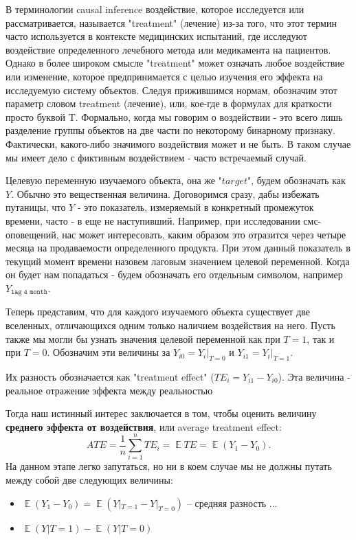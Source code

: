 \documentclass{article}
\DeclareMathOperator{\E}{\mathbb{E}}
\begin{document}
        В терминологии causal inference воздействие, которое исследуется или рассматривается, называется "treatment"{} (лечение) из-за того, что этот термин часто используется в контексте медицинских испытаний, где исследуют воздействие определенного лечебного метода или медикамента на пациентов. Однако в более широком смысле "treatment"{} может означать любое воздействие или изменение, которое предпринимается с целью изучения его эффекта на исследуемую систему объектов. Следуя прижившимся нормам, обозначим этот параметр словом treatment (лечение), или, кое-где в формулах для краткости просто буквой T. Формально, когда мы говорим о воздействии - это всего лишь разделение группы объектов на две части по некоторому бинарному признаку. Фактически, какого-либо значимого воздействия может и не быть. В таком случае мы имеет дело с фиктивным воздействием - часто встречаемый случай.

        Целевую переменную изучаемого объекта, она же "$target$"{}, будем обозначать как $Y$. Обычно это вещественная величина. Договоримся сразу, дабы избежать путаницы, что $Y$ - это показатель, измеряемый в конкретный промежуток времени, часто - в еще не наступивший. Например, при исследовании смс-оповещений, нас может интересовать, каким образом это отразится через четыре месяца на продаваемости определенного продукта. При этом данный показатель в текущий момент времени назовем лаговым значением целевой переменной. Когда он будет нам попадаться - будем обозначать его отдельным символом, например $Y_\texttt{lag 4 month}$.

        Теперь представим, что для каждого изучаемого объекта существует две вселенных, отличающихся одним только наличием воздействия на него. Пусть также мы могли бы узнать значения целевой переменной как при $T=1$, так и при $T=0$. Обозначим эти величины за $Y_{i0} = Y_i|_{T=0}$ и  $Y_{i1}=Y_i|_{T=1}$.

        Их разность обозначается как "treatment effect" ($TE_i=Y_{i1}-Y_{i0}$). Эта величина - реальное отражение эффекта между реальностью

        Тогда наш истинный интерес заключается в том, чтобы оценить величину \textbf{среднего эффекта от воздействия}, или average treatment effect:
        $$
            ATE=
            \frac{1}{n}\displaystyle\sum_{i=1}^nTE_i=
            \E{}TE=
            \E{}(Y_1-Y_0).
        $$
        На данном этапе легко запутаться, но ни в коем случае мы не должны путать между собой две следующих величины:
        \begin{itemize}
          \item $\E{}(Y_1-Y_0) = \E{}(Y|_{T=1}-Y|_{T=0})$ -- средняя разность ...
          \item $\E{}(Y|T=1) - \E{}(Y|T=0)$
        \end{itemize}
\end{document}
